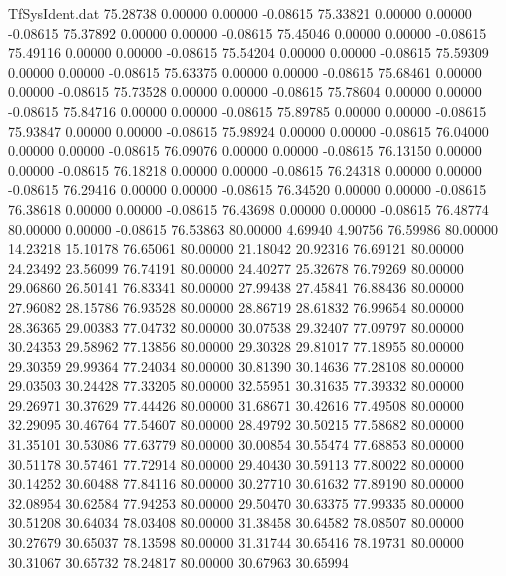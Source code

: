 \begin{filecontents}{TfSysIdent.dat}
  75.28738    0.00000    0.00000   -0.08615
  75.33821    0.00000    0.00000   -0.08615
  75.37892    0.00000    0.00000   -0.08615
  75.45046    0.00000    0.00000   -0.08615
  75.49116    0.00000    0.00000   -0.08615
  75.54204    0.00000    0.00000   -0.08615
  75.59309    0.00000    0.00000   -0.08615
  75.63375    0.00000    0.00000   -0.08615
  75.68461    0.00000    0.00000   -0.08615
  75.73528    0.00000    0.00000   -0.08615
  75.78604    0.00000    0.00000   -0.08615
  75.84716    0.00000    0.00000   -0.08615
  75.89785    0.00000    0.00000   -0.08615
  75.93847    0.00000    0.00000   -0.08615
  75.98924    0.00000    0.00000   -0.08615
  76.04000    0.00000    0.00000   -0.08615
  76.09076    0.00000    0.00000   -0.08615
  76.13150    0.00000    0.00000   -0.08615
  76.18218    0.00000    0.00000   -0.08615
  76.24318    0.00000    0.00000   -0.08615
  76.29416    0.00000    0.00000   -0.08615
  76.34520    0.00000    0.00000   -0.08615
  76.38618    0.00000    0.00000   -0.08615
  76.43698    0.00000    0.00000   -0.08615
  76.48774   80.00000    0.00000   -0.08615
  76.53863   80.00000    4.69940    4.90756
  76.59986   80.00000   14.23218   15.10178
  76.65061   80.00000   21.18042   20.92316
  76.69121   80.00000   24.23492   23.56099
  76.74191   80.00000   24.40277   25.32678
  76.79269   80.00000   29.06860   26.50141
  76.83341   80.00000   27.99438   27.45841
  76.88436   80.00000   27.96082   28.15786
  76.93528   80.00000   28.86719   28.61832
  76.99654   80.00000   28.36365   29.00383
  77.04732   80.00000   30.07538   29.32407
  77.09797   80.00000   30.24353   29.58962
  77.13856   80.00000   29.30328   29.81017
  77.18955   80.00000   29.30359   29.99364
  77.24034   80.00000   30.81390   30.14636
  77.28108   80.00000   29.03503   30.24428
  77.33205   80.00000   32.55951   30.31635
  77.39332   80.00000   29.26971   30.37629
  77.44426   80.00000   31.68671   30.42616
  77.49508   80.00000   32.29095   30.46764
  77.54607   80.00000   28.49792   30.50215
  77.58682   80.00000   31.35101   30.53086
  77.63779   80.00000   30.00854   30.55474
  77.68853   80.00000   30.51178   30.57461
  77.72914   80.00000   29.40430   30.59113
  77.80022   80.00000   30.14252   30.60488
  77.84116   80.00000   30.27710   30.61632
  77.89190   80.00000   32.08954   30.62584
  77.94253   80.00000   29.50470   30.63375
  77.99335   80.00000   30.51208   30.64034
  78.03408   80.00000   31.38458   30.64582
  78.08507   80.00000   30.27679   30.65037
  78.13598   80.00000   31.31744   30.65416
  78.19731   80.00000   30.31067   30.65732
  78.24817   80.00000   30.67963   30.65994

\end{filecontents}
